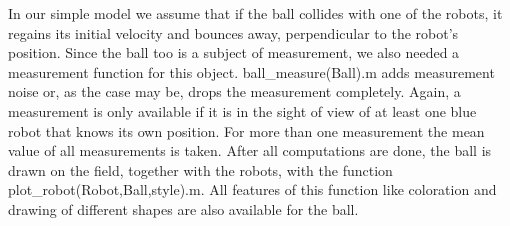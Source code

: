 In our simple model we assume that if the ball collides with one of the robots, it regains its initial velocity and bounces away, perpendicular to the robot's position. Since the ball too is a subject of measurement, we also needed a measurement function for this object. {\selectfont ball\_measure(Ball).m} adds measurement noise or, as the case may be, drops the measurement completely. Again, a measurement is only available if it is in the sight of view of at least one blue robot that knows its own position. For more than one measurement the mean value of all measurements is taken. After all computations are done, the ball is drawn on the field, together with the robots, with the function {\selectfont plot\_robot(Robot,Ball,style).m}. All features of this function like coloration and drawing of different shapes are also available for the ball.

